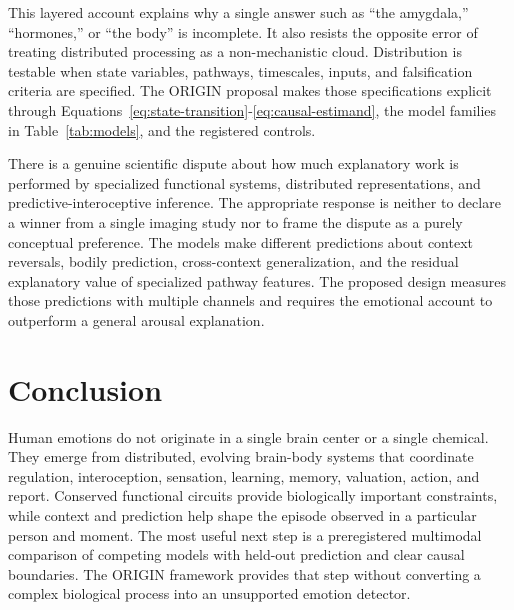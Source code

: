 \documentclass[conference]{IEEEtran}
\begin{document}
This layered account explains why a single answer such as ``the amygdala,'' ``hormones,'' or ``the body'' is incomplete. It also resists the opposite error of treating distributed processing as a non-mechanistic cloud. Distribution is testable when state variables, pathways, timescales, inputs, and falsification criteria are specified. The ORIGIN proposal makes those specifications explicit through Equations~\eqref{eq:state-transition}-\eqref{eq:causal-estimand}, the model families in Table~\ref{tab:models}, and the registered controls.

There is a genuine scientific dispute about how much explanatory work is performed by specialized functional systems, distributed representations, and predictive-interoceptive inference. The appropriate response is neither to declare a winner from a single imaging study nor to frame the dispute as a purely conceptual preference. The models make different predictions about context reversals, bodily prediction, cross-context generalization, and the residual explanatory value of specialized pathway features. The proposed design measures those predictions with multiple channels and requires the emotional account to outperform a general arousal explanation.

\section{Conclusion}

Human emotions do not originate in a single brain center or a single chemical. They emerge from distributed, evolving brain-body systems that coordinate regulation, interoception, sensation, learning, memory, valuation, action, and report. Conserved functional circuits provide biologically important constraints, while context and prediction help shape the episode observed in a particular person and moment. The most useful next step is a preregistered multimodal comparison of competing models with held-out prediction and clear causal boundaries. The ORIGIN framework provides that step without converting a complex biological process into an unsupported emotion detector.
\end{document}
